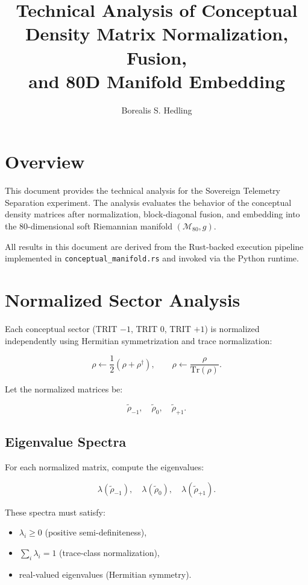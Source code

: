 \documentclass[11pt]{article}
\title{Technical Analysis of Conceptual Density Matrix Normalization, Fusion,\\
and 80D Manifold Embedding}
\author{Borealis S. Hedling}
\date{}
\begin{document}
\maketitle

\section{Overview}

This document provides the technical analysis for the Sovereign Telemetry Separation
experiment. The analysis evaluates the behavior of the conceptual density matrices
after normalization, block-diagonal fusion, and embedding into the 80-dimensional
soft Riemannian manifold $(\mathcal{M}_{80}, g)$.

All results in this document are derived from the Rust-backed execution pipeline
implemented in \texttt{conceptual\_manifold.rs} and invoked via the Python runtime.

\section{Normalized Sector Analysis}

Each conceptual sector (TRIT $-1$, TRIT $0$, TRIT $+1$) is normalized independently
using Hermitian symmetrization and trace normalization:

\[
\rho \leftarrow \frac{1}{2}(\rho + \rho^\dagger), \qquad
\rho \leftarrow \frac{\rho}{\mathrm{Tr}(\rho)}.
\]

Let the normalized matrices be:

\[
\tilde{\rho}_{-1}, \quad \tilde{\rho}_{0}, \quad \tilde{\rho}_{+1}.
\]

\subsection{Eigenvalue Spectra}

For each normalized matrix, compute the eigenvalues:

\[
\lambda(\tilde{\rho}_{-1}), \quad
\lambda(\tilde{\rho}_{0}), \quad
\lambda(\tilde{\rho}_{+1}).
\]

These spectra must satisfy:

\begin{itemize}
    \item $\lambda_i \ge 0$ (positive semi-definiteness),
    \item $\sum_i \lambda_i = 1$ (trace-class normalization),
    \item real-valued eigenvalues (Hermitian symmetry).
\end{itemize}
\end{document}
